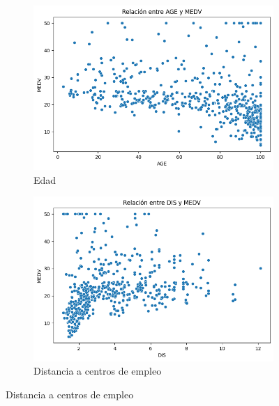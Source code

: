 \documentclass[12pt,a4paper]{article}
\begin{document}
\begin{figure}[H]
\begin{subfigure}[t]{0.24\textwidth}
    \includegraphics[width=\textwidth]{images/age_medv.png}
    \caption{\footnotesize Edad}
    \label{fig:modelo_age}
\end{subfigure}
\hfill
\begin{subfigure}[t]{0.24\textwidth}
    \centering
    \includegraphics[width=\textwidth]{images/dis_medv.png}
    \caption{\footnotesize Distancia a centros de empleo}
    \label{fig:modelo_dis}
\end{subfigure}

\vspace{0.2cm}


\end{figure}
\end{document}
